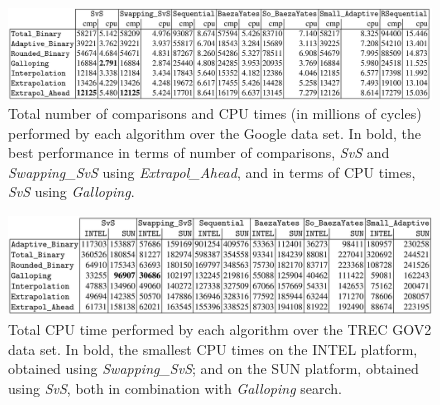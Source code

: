 \begin{figure}[h] 
    \begin{center}
        \includegraphics[width=.8\textwidth]{imgs/barbay_table5.png}
        \caption{Total number of comparisons and CPU times (in millions of cycles) performed by each algorithm over the Google data set.
        In bold, the best performance in terms of number of comparisons, \textit{SvS} and \textit{Swapping\_SvS} using \textit{Extrapol\_Ahead}, and in terms
        of CPU times, \textit{SvS} using \textit{Galloping}. \citep{barbay_ortiz} \label{fig:barbay2}}
    \end{center}
\end{figure}

\begin{figure}[h] 
    \begin{center}
        \includegraphics[width=.8\textwidth]{imgs/barbay_table7.png}
        \caption{Total CPU time performed by each algorithm over the TREC GOV2 data set. In bold, the smallest CPU times on the INTEL
        platform, obtained using \textit{Swapping\_SvS}; and on the SUN platform, obtained using \textit{SvS}, both in combination with \textit{Galloping}
        search. \citep{barbay_ortiz} \label{fig:barbay3}}
    \end{center}
\end{figure}